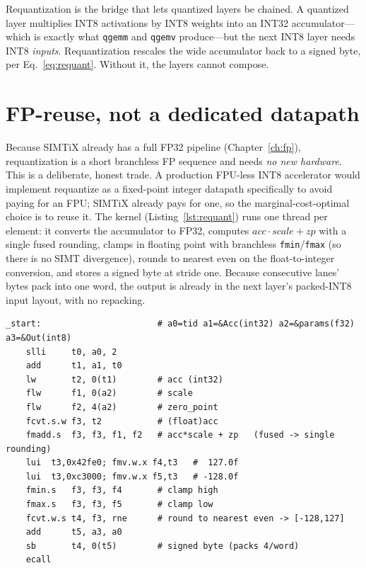 \documentclass[12pt,a4paper,oneside]{report}
\newcommand{\code}[1]{\texttt{#1}}
\begin{document}
Requantization is the bridge that lets quantized layers be chained. A quantized
layer multiplies INT8 activations by INT8 weights into an INT32 accumulator---which
is exactly what \code{qgemm} and \code{qgemv} produce---but the next INT8 layer
needs INT8 \emph{inputs}. Requantization rescales the wide accumulator back to a
signed byte, per Eq.~\eqref{eq:requant}. Without it, the layers cannot compose.

\section{FP-reuse, not a dedicated datapath}
Because SIMTiX already has a full FP32 pipeline (Chapter~\ref{ch:fp}),
requantization is a short branchless FP sequence and needs \emph{no new hardware}.
This is a deliberate, honest trade. A production FPU-less INT8 accelerator would
implement requantize as a fixed-point integer datapath specifically to avoid
paying for an FPU; SIMTiX already pays for one, so the marginal-cost-optimal choice
is to reuse it. The kernel (Listing~\ref{lst:requant}) runs one thread per element:
it converts the accumulator to FP32, computes $\mathit{acc}\cdot\mathit{scale}+\mathit{zp}$
with a single fused rounding, clamps in floating point with branchless
\code{fmin}/\code{fmax} (so there is no SIMT divergence), rounds to nearest even on
the float-to-integer conversion, and stores a signed byte at stride one. Because
consecutive lanes' bytes pack into one word, the output is already in the next
layer's packed-INT8 input layout, with no repacking.

\begin{lstlisting}[caption={The requantization kernel (FP-reuse). The clamp is done
in floating point, before the integer conversion, so it is branchless and does not
diverge. A \emph{requant\_relu} variant clamps the low bound to 0 to fuse the ReLU
activation.},label={lst:requant}]
_start:                       # a0=tid a1=&Acc(int32) a2=&params(f32) a3=&Out(int8)
    slli     t0, a0, 2
    add      t1, a1, t0
    lw       t2, 0(t1)        # acc (int32)
    flw      f1, 0(a2)        # scale
    flw      f2, 4(a2)        # zero_point
    fcvt.s.w f3, t2           # (float)acc
    fmadd.s  f3, f3, f1, f2   # acc*scale + zp   (fused -> single rounding)
    lui  t3,0x42fe0; fmv.w.x f4,t3   #  127.0f
    lui  t3,0xc3000; fmv.w.x f5,t3   # -128.0f
    fmin.s   f3, f3, f4       # clamp high
    fmax.s   f3, f3, f5       # clamp low
    fcvt.w.s t4, f3, rne      # round to nearest even -> [-128,127]
    add      t5, a3, a0
    sb       t4, 0(t5)        # signed byte (packs 4/word)
    ecall
\end{lstlisting}
\end{document}
